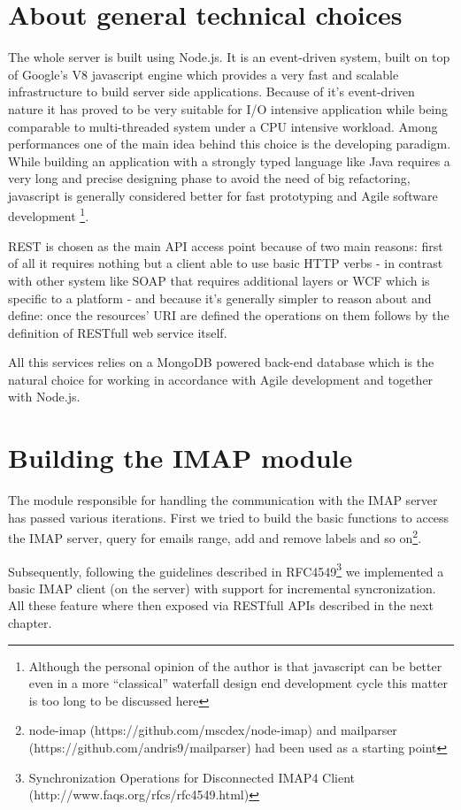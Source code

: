 \documentclass[a4paper,12pt]{report}
\begin{document}
\section{About general technical choices}
The whole server is built using Node.js. It is an event-driven system, built on top of Google's V8 javascript engine which provides a very fast and scalable infrastructure to build server side applications. Because of it's event-driven nature it has proved to be very suitable for I/O intensive application while being comparable to multi-threaded system under a CPU intensive workload. Among performances one of the main idea behind this choice is the developing paradigm. While building an application with a strongly typed language like Java requires a very long and precise designing phase to avoid the need of big refactoring, javascript is generally considered better for fast prototyping and Agile software development \footnote{Although the personal opinion of the author is that javascript can be better even in a more ``classical'' waterfall design end development cycle this matter is too long to be discussed here}.

REST is chosen as the main API access point because of two main reasons: first of all it requires nothing but a client able to use basic HTTP verbs - in contrast with other system like SOAP that requires additional layers or WCF which is specific to a platform - and because it's generally simpler to reason about and define: once the resources' URI are defined the operations on them follows by the definition of RESTfull web service itself. 

All this services relies on a MongoDB powered back-end database which is the natural choice for working in accordance with Agile development and together with Node.js.

\section{Building the IMAP module}
The module responsible for handling the communication with the IMAP server has passed various iterations.
First we tried to build the basic functions to access the IMAP server, query for emails range, add and remove labels and so on\footnote{node-imap (https://github.com/mscdex/node-imap) and mailparser (https://github.com/andris9/mailparser) had been used as a starting point}. 

Subsequently, following the guidelines described in RFC4549\footnote{Synchronization Operations for Disconnected IMAP4 Client (http://www.faqs.org/rfcs/rfc4549.html)} we implemented a basic IMAP client (on the server) with support for incremental syncronization. 
All these feature where then exposed via RESTfull APIs described in the next chapter.
\end{document}
